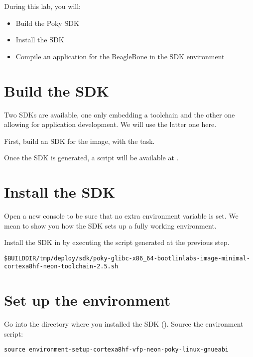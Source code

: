 
During this lab, you will:
\begin{itemize}
  \item Build the Poky SDK
  \item Install the SDK
  \item Compile an application for the BeagleBone in the SDK
    environment
\end{itemize}

\section{Build the SDK}

Two SDKs are available, one only embedding a toolchain and the
other one allowing for application development. We will use the latter one
here.

First, build an SDK for the  image, with
the  task.

Once the SDK is generated, a script will be available at
.

\section{Install the SDK}

Open a new console to be sure that no extra environment variable is set.
We mean to show you how the SDK sets up a fully working environment.

Install the SDK in  by executing the script
generated at the previous step.

{\footnotesize
\begin{verbatim}
$BUILDDIR/tmp/deploy/sdk/poky-glibc-x86_64-bootlinlabs-image-minimal-cortexa8hf-neon-toolchain-2.5.sh
\end{verbatim}
}

\section{Set up the environment}

Go into the directory where you installed the SDK
(). Source the environment script:
\begin{verbatim}
source environment-setup-cortexa8hf-vfp-neon-poky-linux-gnueabi
\end{verbatim}

